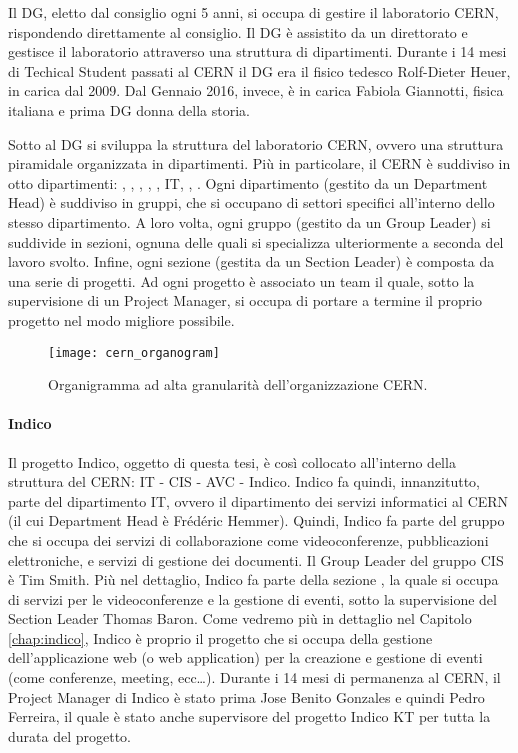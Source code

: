 			Il \ac{DG}, eletto dal consiglio ogni 5 anni, si occupa di gestire il laboratorio \ac{CERN}, rispondendo direttamente al consiglio. Il \ac{DG} è assistito da un direttorato e gestisce il laboratorio attraverso una struttura di dipartimenti. Durante i 14 mesi di Techical Student passati al \ac{CERN} il \ac{DG} era il fisico tedesco Rolf-Dieter Heuer, in carica dal 2009. Dal Gennaio 2016, invece, è in carica Fabiola Giannotti, fisica italiana e prima \ac{DG} donna della storia.
			
			Sotto al \ac{DG} si sviluppa la struttura del laboratorio \ac{CERN}, ovvero una struttura piramidale organizzata in dipartimenti. Più in particolare, il \ac{CERN} è suddiviso in otto dipartimenti: , , , , , \ac{IT}, , . Ogni dipartimento (gestito da un Department Head) è suddiviso in gruppi, che si occupano di settori specifici all'interno dello stesso dipartimento. A loro volta, ogni gruppo (gestito da un Group Leader) si suddivide in sezioni, ognuna delle quali si specializza ulteriormente a seconda del lavoro svolto. Infine, ogni sezione (gestita da un Section Leader) è composta da una serie di progetti. Ad ogni progetto è associato un team il quale, sotto la supervisione di un Project Manager, si occupa di portare a termine il proprio progetto nel modo migliore possibile. \cite{cern:structure}

			\begin{figure}[h!]
				\begin{center}
					\texttt{[image: cern\_organogram]}
				\end{center}
				\caption[Organigramma del CERN]{Organigramma ad alta granularità dell'organizzazione CERN.}
				\label{fig:cern_organogram}
			\end{figure}
			
			\paragraph{Indico}Il progetto Indico, oggetto di questa tesi, è così collocato all'interno della struttura del \ac{CERN}: \ac{IT} - \acs{CIS} - \acs{AVC} - Indico. Indico fa quindi, innanzitutto, parte del dipartimento \ac{IT}, ovvero il dipartimento dei servizi informatici al \ac{CERN} (il cui Department Head è Frédéric Hemmer). Quindi, Indico fa parte del gruppo  che si occupa dei servizi di collaborazione come videoconferenze, pubblicazioni elettroniche, e servizi di gestione dei documenti. Il Group Leader del gruppo \ac{CIS} è Tim Smith. Più nel dettaglio, Indico fa parte della sezione , la quale si occupa di servizi per le videoconferenze e la gestione di eventi, sotto la supervisione del Section Leader Thomas Baron. Come vedremo più in dettaglio nel Capitolo \ref{chap:indico}, Indico è proprio il progetto che si occupa della gestione dell'applicazione web (o web application) per la creazione e gestione di eventi (come conferenze, meeting, ecc\dots). Durante i 14 mesi di permanenza al \ac{CERN}, il Project Manager di Indico è stato prima Jose Benito Gonzales e quindi Pedro Ferreira, il quale è stato anche supervisore del progetto Indico KT per tutta la durata del progetto.
		
